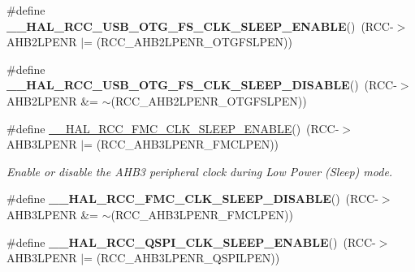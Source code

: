 \begin{DoxyCompactItemize}
\item 
\mbox{\label{group___r_c_c_ex___peripheral___clock___sleep___enable___disable_ga043ce43b32ec91f2b032f746509079cd}} 
\#define {\bfseries \+\_\+\+\_\+\+H\+A\+L\+\_\+\+R\+C\+C\+\_\+\+U\+S\+B\+\_\+\+O\+T\+G\+\_\+\+F\+S\+\_\+\+C\+L\+K\+\_\+\+S\+L\+E\+E\+P\+\_\+\+E\+N\+A\+B\+LE}()~(R\+CC-\/$>$A\+H\+B2\+L\+P\+E\+NR $\vert$= (R\+C\+C\+\_\+\+A\+H\+B2\+L\+P\+E\+N\+R\+\_\+\+O\+T\+G\+F\+S\+L\+P\+EN))
\item 
\mbox{\label{group___r_c_c_ex___peripheral___clock___sleep___enable___disable_ga4d8498985e2b924e443065da8a2890b2}} 
\#define {\bfseries \+\_\+\+\_\+\+H\+A\+L\+\_\+\+R\+C\+C\+\_\+\+U\+S\+B\+\_\+\+O\+T\+G\+\_\+\+F\+S\+\_\+\+C\+L\+K\+\_\+\+S\+L\+E\+E\+P\+\_\+\+D\+I\+S\+A\+B\+LE}()~(R\+CC-\/$>$A\+H\+B2\+L\+P\+E\+NR \&= $\sim$(R\+C\+C\+\_\+\+A\+H\+B2\+L\+P\+E\+N\+R\+\_\+\+O\+T\+G\+F\+S\+L\+P\+EN))
\item 
\#define \mbox{\hyperlink{group___r_c_c_ex___peripheral___clock___sleep___enable___disable_ga387cf373f0b77ef8d434a3a6f93bbd11}{\+\_\+\+\_\+\+H\+A\+L\+\_\+\+R\+C\+C\+\_\+\+F\+M\+C\+\_\+\+C\+L\+K\+\_\+\+S\+L\+E\+E\+P\+\_\+\+E\+N\+A\+B\+LE}}()~(R\+CC-\/$>$A\+H\+B3\+L\+P\+E\+NR $\vert$= (R\+C\+C\+\_\+\+A\+H\+B3\+L\+P\+E\+N\+R\+\_\+\+F\+M\+C\+L\+P\+EN))
\begin{DoxyCompactList}\small\item\em Enable or disable the A\+H\+B3 peripheral clock during Low Power (Sleep) mode. \end{DoxyCompactList}\item 
\mbox{\label{group___r_c_c_ex___peripheral___clock___sleep___enable___disable_ga6b5acf19e24d90165eb5bd6bee84f5be}} 
\#define {\bfseries \+\_\+\+\_\+\+H\+A\+L\+\_\+\+R\+C\+C\+\_\+\+F\+M\+C\+\_\+\+C\+L\+K\+\_\+\+S\+L\+E\+E\+P\+\_\+\+D\+I\+S\+A\+B\+LE}()~(R\+CC-\/$>$A\+H\+B3\+L\+P\+E\+NR \&= $\sim$(R\+C\+C\+\_\+\+A\+H\+B3\+L\+P\+E\+N\+R\+\_\+\+F\+M\+C\+L\+P\+EN))
\item 
\mbox{\label{group___r_c_c_ex___peripheral___clock___sleep___enable___disable_gaaa7ac6f21ab0318d7fa79968ddfbff78}} 
\#define {\bfseries \+\_\+\+\_\+\+H\+A\+L\+\_\+\+R\+C\+C\+\_\+\+Q\+S\+P\+I\+\_\+\+C\+L\+K\+\_\+\+S\+L\+E\+E\+P\+\_\+\+E\+N\+A\+B\+LE}()~(R\+CC-\/$>$A\+H\+B3\+L\+P\+E\+NR $\vert$= (R\+C\+C\+\_\+\+A\+H\+B3\+L\+P\+E\+N\+R\+\_\+\+Q\+S\+P\+I\+L\+P\+EN))

\end{DoxyCompactItemize}
